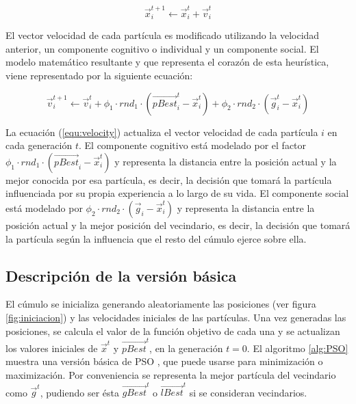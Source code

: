       \begin{equation}
	  \vec{x}^{t+1}_i \leftarrow  \vec{x}^t_i + \vec{v}^t_i
      \label{equ:position}
      \end{equation}

      El vector velocidad de cada part\'icula es modificado utilizando la velocidad anterior, un componente cognitivo o individual  
      y un componente social. El modelo matem\'atico resultante y que representa el coraz\'on de esta heur\'istica, viene representado 
      por la siguiente ecuaci\'on:

      \begin{equation}
	  \vec{v}^{t+1}_{i} \leftarrow \vec{v}^t_i + \phi_1 \cdot rnd_1 \cdot \left(\vec{pBest}^t_i - \vec{x}^t_i \right) 
					    + \phi_2 \cdot rnd_2 \cdot \left(\vec{g}^t_i - \vec{x}^t_i \right) 
      \label{equ:velocity}
      \end{equation}

      La ecuaci\'on (\ref{equ:velocity}) actualiza el vector velocidad de cada part\'icula $i$ en cada generaci\'on $t$. El componente
      cognitivo est\'a modelado por el factor $\phi_1 \cdot rnd_1 \cdot \left(\vec{pBest}_i - \vec{x}^t_i \right)$ y representa la distancia 
      entre la posici\'on actual y la mejor conocida por esa part\'icula, es decir, la decisi\'on que tomar\'a la part\'icula influenciada por 
      su propia experiencia a lo largo de su vida. El componente social est\'a modelado por 
      $\phi_2 \cdot rnd_2 \cdot \left(\vec{g}_i - \vec{x}^t_i \right)$ 
      y representa la distancia entre la posici\'on actual y la mejor posici\'on del vecindario, es decir, la decisi\'on que tomar\'a la 
      part\'icula seg\'un la influencia que el resto del c\'umulo ejerce sobre ella.     
    
    \subsection{Descripci\'on de la versi\'on b\'asica}
    
    El c\'umulo se inicializa generando aleatoriamente las posiciones (ver figura \ref{fig:iniciacion}) y las velocidades iniciales de las part\'iculas. Una vez generadas 
    las posiciones, se calcula el valor de la funci\'on objetivo de cada una y se actualizan los valores iniciales de $\vec{x}^t$ y 
    $\vec{pBest}^t$, en la 
    generaci\'on $t = 0$.  El algoritmo \ref{alg:PSO} muestra una versi\'on b\'asica de PSO \cite{JKennedySI}, que puede usarse para minimizaci\'on o 
    maximizaci\'on. Por conveniencia se representa la mejor part\'icula del vecindario como $\vec{g}^t$, pudiendo ser \'esta $\vec{gBest}^t$ o 
    $\vec{lBest}^t$ si se consideran vecindarios.

